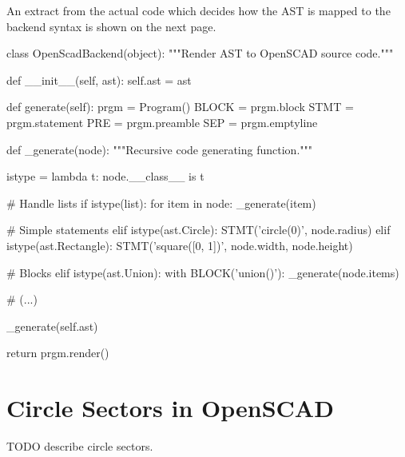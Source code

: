 An extract from the actual code which decides how the AST is mapped to the
backend syntax is shown on the next page.

\vspace{.5\baselineskip}
\begin{pythoncode}
class OpenScadBackend(object):
    """Render AST to OpenSCAD source code."""

    def __init__(self, ast):
        self.ast = ast

    def generate(self):
        prgm = Program()
        BLOCK = prgm.block
        STMT = prgm.statement
        PRE = prgm.preamble
        SEP = prgm.emptyline

        def _generate(node):
            """Recursive code generating function."""

            istype = lambda t: node.__class__ is t

            # Handle lists
            if istype(list):
                for item in node:
                    _generate(item)

            # Simple statements
            elif istype(ast.Circle):
                STMT('circle({0})', node.radius)
            elif istype(ast.Rectangle):
                STMT('square([{0}, {1}])', node.width, node.height)

            # Blocks
            elif istype(ast.Union):
                with BLOCK('union()'):
                    _generate(node.items)

            # (...)

        _generate(self.ast)

        return prgm.render()
\end{pythoncode}



\newpage
\section{Circle Sectors in OpenSCAD}\label{sec:design:circlesectors}

TODO describe circle sectors.
